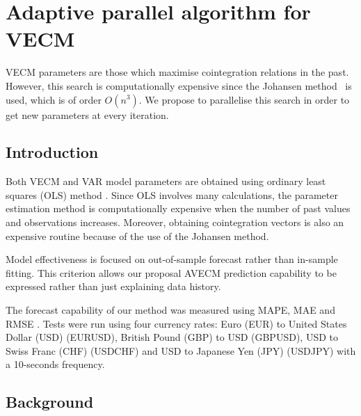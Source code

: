 
\chapter{Adaptive parallel algorithm for VECM}

VECM parameters are those which maximise cointegration relations in the past. However, this search is computationally expensive since the Johansen
method~\cite{johansen1995} is used, which is of order $O(n^3)$. We propose
to parallelise this search in order to get new parameters at every iteration. 

\vspace{0.5cm} 

\section{Introduction}
Both VECM and VAR model parameters are obtained using ordinary least squares
(OLS) method \cite{golub1980}. Since OLS involves many calculations, the parameter estimation
method is computationally expensive when the number of past values and
observations increases. Moreover, obtaining cointegration vectors 
is also an expensive routine because of the use of the Johansen method.

Model effectiveness is focused on out-of-sample forecast rather than in-sample
fitting. This criterion allows our proposal AVECM prediction capability to be
expressed rather than just explaining data history.

The forecast capability of our method was measured using MAPE, MAE and
RMSE \cite{armstrong1992}. Tests were run using four currency rates: Euro (EUR) to
United States Dollar (USD) (EURUSD), British Pound (GBP) to USD (GBPUSD), USD to Swiss
Franc (CHF) (USDCHF) and USD to Japanese Yen (JPY) (USDJPY) with a 10-seconds frequency.

\def\rot#1{{\color{red}{#1}}}
\def\gruen#1{{\color{green}{#1}}}
\def\blau#1{{\color{blue}{#1}}}


\section{Background}
\label{sec:background}

